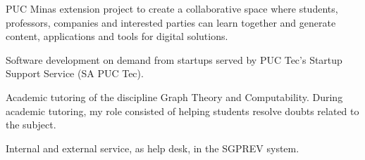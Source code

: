 PUC Minas extension project to create a collaborative space where students, professors, companies and interested parties can learn together and generate content, applications and tools for digital solutions.

\divider
{}
Software development on demand from startups served by PUC Tec's Startup Support Service (SA PUC Tec).

\divider
{}
Academic tutoring of the discipline Graph Theory and Computability. During academic tutoring, my role consisted of helping students resolve doubts related to the subject.

\divider
{}
Internal and external service, as help desk, in the SGPREV system.